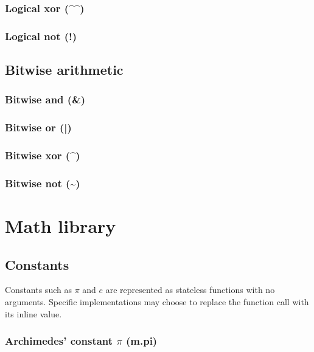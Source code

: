 \documentclass{article}
\theoremstyle{definition}
\begin{document}
\subsubsection{Logical xor (\^{}\^{})}
\libfcn{\^{}\^{}}

\subsubsection{Logical not (!)}
\libfcn{!}

\subsection{Bitwise arithmetic}

\subsubsection{Bitwise and (\&)}
\libfcn{\&}

\subsubsection{Bitwise or (|)}
\libfcn{|}

\subsubsection{Bitwise xor (\^{})}
\libfcn{\^{}}

\subsubsection{Bitwise not (\textasciitilde{})}

\pagebreak

\section{Math library}

\subsection{Constants}

Constants such as $\pi$ and $e$ are represented as stateless functions with no arguments.  Specific implementations may choose to replace the function call with its inline value.

\subsubsection{Archimedes' constant $\pi$ (m.pi)}
\end{document}
